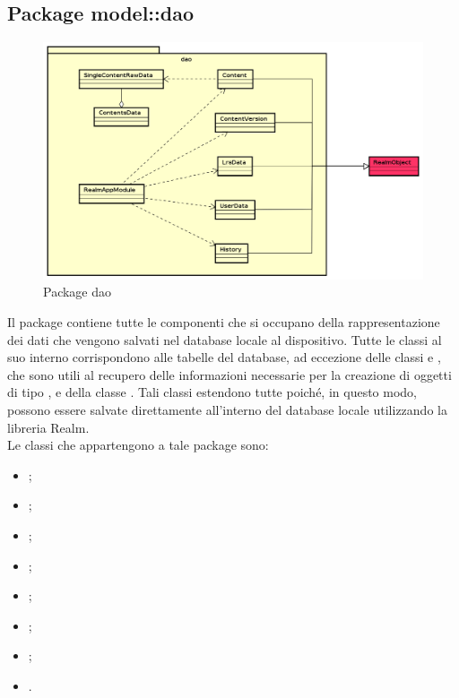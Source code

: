 \documentclass[../Tesi.tex]{subfiles}
\begin{document}
	\subsection{Package model::dao}
		\begin{figure}[H]
			\centering
			\includegraphics[scale=0.5]{images/package_diagrams/dao}
				\caption{Package dao}
		\end{figure}
		Il package  contiene tutte le componenti che si occupano della rappresentazione dei dati che vengono salvati nel database locale al dispositivo. Tutte le classi al suo interno corrispondono alle tabelle del database, ad eccezione delle classi  e , che sono utili al recupero delle informazioni necessarie per la creazione di oggetti di tipo , e della classe . Tali classi estendono tutte  poiché, in questo modo, possono essere salvate direttamente all'interno del database locale utilizzando la libreria Realm. \\
		Le classi che appartengono a tale package sono:
		\begin{itemize}
			\item {};
			\item {};
			\item {};
			\item {};
			\item {};
			\item {};
			\item {};
			\item {}.
		\end{itemize}
\end{document}

